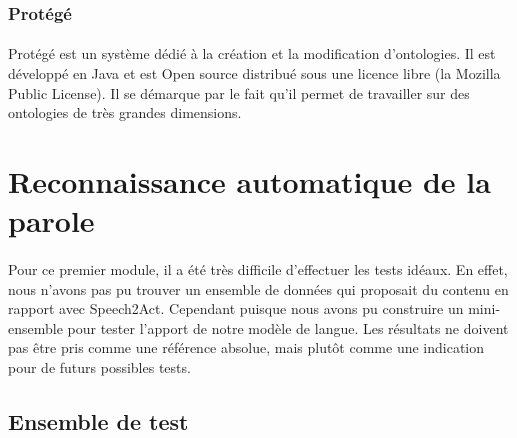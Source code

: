 		\subsubsection*{Protégé}
		\paragraph{}
		Protégé est un système dédié à la création et la modification d'ontologies. Il est développé en Java et est Open source distribué sous une licence libre (la Mozilla Public License). Il se démarque par le fait qu'il permet de travailler sur des ontologies de très grandes dimensions.
		
		
\section{Reconnaissance automatique de la parole}
\paragraph{}
Pour ce premier module, il a été très difficile d'effectuer les tests idéaux. En effet, nous n'avons pas pu trouver un ensemble de données qui proposait du contenu en rapport avec Speech2Act. Cependant puisque nous avons pu construire un mini-ensemble pour tester l'apport de notre modèle de langue. Les résultats ne doivent pas être pris comme une référence absolue, mais plutôt comme une indication pour de futurs possibles tests.
	\subsection{Ensemble de test}
